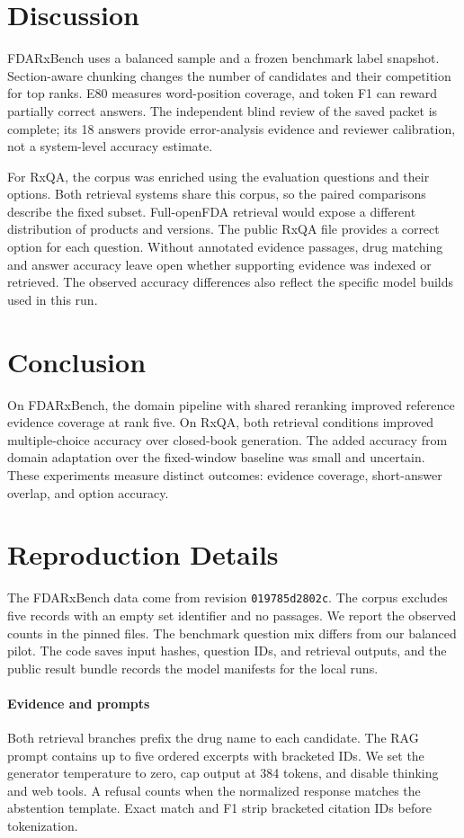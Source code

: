 \documentclass[11pt]{article}
\begin{document}
\section{Discussion}
FDARxBench uses a balanced sample and a frozen benchmark label snapshot. Section-aware chunking changes the number of candidates and their competition for top ranks. E80 measures word-position coverage, and token F1 can reward partially correct answers. The independent blind review of the saved packet is complete; its 18 answers provide error-analysis evidence and reviewer calibration, not a system-level accuracy estimate.

For RxQA, the corpus was enriched using the evaluation questions and their options. Both retrieval systems share this corpus, so the paired comparisons describe the fixed subset. Full-openFDA retrieval would expose a different distribution of products and versions. The public RxQA file provides a correct option for each question. Without annotated evidence passages, drug matching and answer accuracy leave open whether supporting evidence was indexed or retrieved. The observed accuracy differences also reflect the specific model builds used in this run.

\section{Conclusion}
On FDARxBench, the domain pipeline with shared reranking improved reference evidence coverage at rank five. On RxQA, both retrieval conditions improved multiple-choice accuracy over closed-book generation. The added accuracy from domain adaptation over the fixed-window baseline was small and uncertain. These experiments measure distinct outcomes: evidence coverage, short-answer overlap, and option accuracy.



\appendix
\section{Reproduction Details}
The FDARxBench data come from revision \texttt{019785d2802c}. The corpus excludes five records with an empty set identifier and no passages. We report the observed counts in the pinned files. The benchmark question mix differs from our balanced pilot. The code saves input hashes, question IDs, and retrieval outputs, and the public result bundle records the model manifests for the local runs.
\paragraph{Evidence and prompts}
Both retrieval branches prefix the drug name to each candidate. The RAG prompt contains up to five ordered excerpts with bracketed IDs. We set the generator temperature to zero, cap output at 384 tokens, and disable thinking and web tools. A refusal counts when the normalized response matches the abstention template. Exact match and F1 strip bracketed citation IDs before tokenization.
\end{document}
